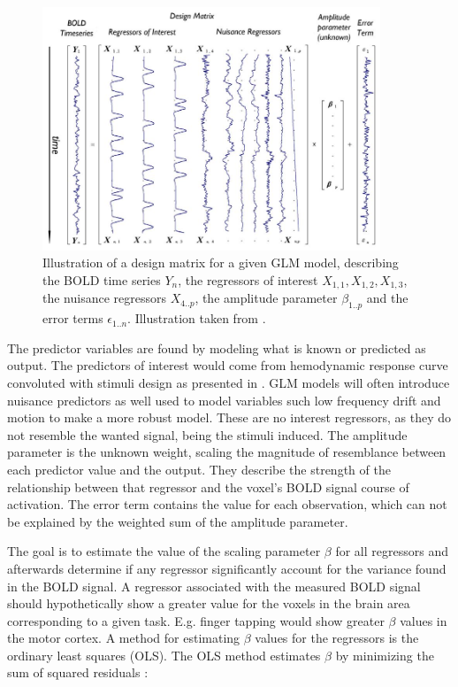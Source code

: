 \begin{figure}[H] 
	\includegraphics[width=0.90\textwidth]{figures/aBackground/GLM}
	\caption{Illustration of a design matrix for a given GLM model, describing the BOLD time series $Y_n$, the regressors of interest $X_{1,1}, X_{1,2}, X_{1,3}$, the nuisance regressors $X_{4..p}$, the amplitude parameter $\beta_{1..p}$ and the error terms $\epsilon_{1..n}$. Illustration taken from \cite{Monti2011}.}
	\label{fig:GLM}
\end{figure}



The predictor variables are found by modeling what is known or predicted as output. The predictors of interest would come from hemodynamic response curve convoluted with stimuli design as presented in . GLM models will often introduce nuisance predictors as well used to model variables such low frequency drift and motion to make a more robust model. These are no interest regressors, as they do not resemble the wanted signal, being the stimuli induced. The amplitude parameter is the unknown weight, scaling the magnitude of resemblance between each predictor value and the output. They describe the strength of the relationship between that regressor and the voxel's BOLD signal course of activation. The error term contains the value for each observation, which can not be explained by the weighted sum of the amplitude parameter. \cite{Moayedi2018,Monti2011} 

The goal is to estimate the value of the scaling parameter $\beta$ for all regressors and afterwards determine if any regressor significantly account for the variance found in the BOLD signal. A regressor associated with the measured BOLD signal should hypothetically show a greater value for the voxels in the brain area corresponding to a given task. E.g. finger tapping would show greater $\beta$ values in the motor cortex. A method for estimating $\beta$ values for the regressors is the ordinary least squares (OLS). The OLS method estimates $\beta$ by minimizing the sum of squared residuals \cite{Monti2011}: 

